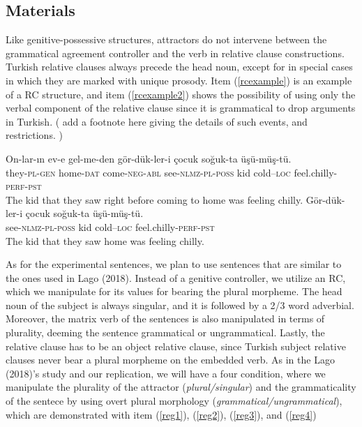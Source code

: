 \documentclass[doc]{apa6}
\begin{document}
\subsection{Materials}\label{materials}

Like genitive-possessive structures, attractors do not intervene between
the grammatical agreement controller and the verb in relative clause
constructions. Turkish relative clauses always precede the head noun,
except for in special cases in which they are marked with unique
prosody. Item (\ref{rcexample}) is an example of a RC structure, and
item (\ref{rcexample2}) shows the possibility of using only the verbal
component of the relative clause since it is grammatical to drop
arguments in Turkish. ( add a footnote here giving the details of such
events, and restrictions. )

\begin{exe}
\ex
  \begin{xlist}
    \ex \label{rcexample}
    \gll On-lar-{\i}n ev-e gel-me-den g\"{o}r-d\"{u}k-ler-i \c{c}ocuk so\u{g}uk-ta \"{u}\c{s}\"{u}-m\"{u}\c{s}-t\"{u}.\\
    they-\textsc{pl}-\textsc{gen} home-\textsc{dat} come-\textsc{neg}-\textsc{abl} see-\textsc{nlmz}-\textsc{pl}-\textsc{poss} kid cold--\textsc{loc} feel.chilly-\textsc{perf}-\textsc{pst}\\
    \glt The kid that they saw right before coming to home was feeling chilly. 
    \ex \label{rcexample2}
    \gll G\"{o}r-d\"{u}k-ler-i \c{c}ocuk so\u{g}uk-ta \"{u}\c{s}\"{u}-m\"{u}\c{s}-t\"{u}.\\
    see-\textsc{nlmz}-\textsc{pl}-\textsc{poss} kid cold--\textsc{loc} feel.chilly-\textsc{perf}-\textsc{pst}\\
    \glt The kid that they saw home was feeling chilly.
  \end{xlist}
\end{exe}

As for the experimental sentences, we plan to use sentences that are
similar to the ones used in Lago (2018). Instead of a genitive
controller, we utilize an RC, which we manipulate for its values for
bearing the plural morpheme. The head noun of the subject is always
singular, and it is followed by a 2/3 word adverbial. Moreover, the
matrix verb of the sentences is also manipulated in terms of plurality,
deeming the sentence grammatical or ungrammatical. Lastly, the relative
clause has to be an object relative clause, since Turkish subject
relative clauses never bear a plural morpheme on the embedded verb. As
in the Lago (2018)'s study and our replication, we will have a four
condition, where we manipulate the plurality of the attractor
(\emph{plural/singular}) and the grammaticality of the sentece by using
overt plural morphology (\emph{grammatical/ungrammatical}), which are
demonstrated with item (\ref{reg1}), (\ref{reg2}), (\ref{reg3}), and
(\ref{reg4})
\end{document}
